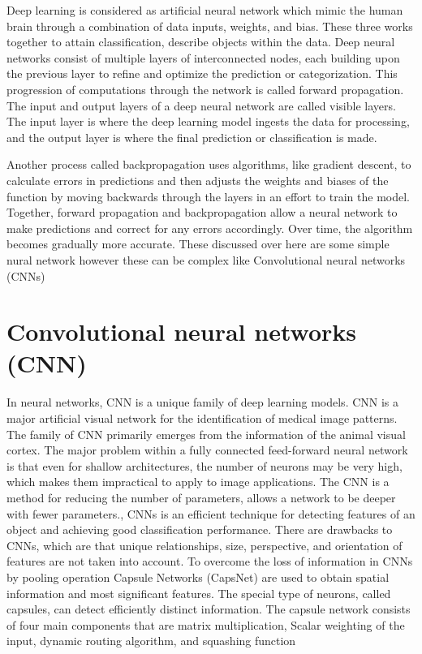 \documentclass{article}
\begin{document}
Deep learning is considered as artificial neural network which mimic the human brain through a combination of data inputs, weights, and bias. These three works together to attain classification, describe objects within the data. Deep neural networks consist of multiple layers of interconnected nodes, each building upon the previous layer to refine and optimize the prediction or categorization. This progression of computations through the network is called forward propagation. The input and output layers of a deep neural network are called visible layers. The input layer is where the deep learning model ingests the data for processing, and the output layer is where the final prediction or classification is made. 

Another process called backpropagation uses algorithms, like gradient descent, to calculate errors in predictions and then adjusts the weights and biases of the function by moving backwards through the layers in an effort to train the model. Together, forward propagation and backpropagation allow a neural network to make predictions and correct for any errors accordingly. Over time, the algorithm becomes gradually more accurate. These discussed over here are some simple nural network however these can be complex like Convolutional neural networks (CNNs) 


\section*{Convolutional neural networks (CNN)} 


In neural networks, CNN is a unique family of deep learning models. CNN is a major artificial visual network for the identification of medical image patterns. The family of CNN primarily emerges from the information of the animal visual cortex. The major problem within a fully connected feed-forward neural network is that even for shallow architectures, the number of neurons may be very high, which makes them impractical to apply to image applications. The CNN is a method for reducing the number of parameters, allows a network to be deeper with fewer parameters., CNNs is an efficient technique for detecting features of an object and achieving good classification performance. There are drawbacks to CNNs, which are that unique relationships, size, perspective, and orientation of features are not taken into account. To overcome the loss of information in CNNs by pooling operation Capsule Networks (CapsNet) are used to obtain spatial information and most significant features. The special type of neurons, called capsules, can detect efficiently distinct information. The capsule network consists of four main components that are matrix multiplication, Scalar weighting of the input, dynamic routing algorithm, and squashing function 
\end{document}
